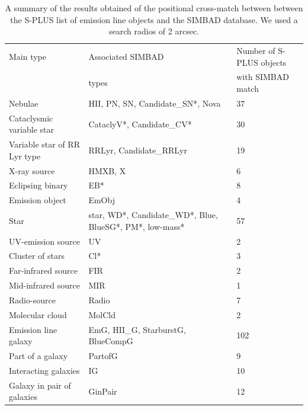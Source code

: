 \documentclass[fleqn,usenatbib]{mnras}
\begin{document}
\begin{table}
\centering
\caption{A summary of the results obtained of the positional cross-match between
        between the S-PLUS list of emission line objects and the SIMBAD database.
        We used a search radios of 2 arcsec.}
\label{tab:simbad-sources}
\begin{tabular}{lll} %
  \hline
Main type    & Associated SIMBAD           & Number of S-PLUS objects    \\
             & types                        &  with SIMBAD match         \\
\hline
Nebulae                & HII, PN, SN, Candidate\_SN*, Nova  & 37               \\
Cataclysmic variable star  & CataclyV*, Candidate\_CV* & 30              \\
Variable star of RR Lyr type & RRLyr, Candidate\_RRLyr & 19              \\
X-ray source                & HMXB, X                  & 6               \\
Eclipsing binary            & EB*                    & 8                 \\            
Emission object             & EmObj                  & 4                 \\
Star                        & star, WD*, Candidate\_WD*, Blue, BlueSG*, PM*, low-mass* & 57 \\
UV-emission source          & UV                     & 2                 \\
Cluster of stars            & Cl*                    & 3                 \\
Far-infrared source         & FIR                    & 2                 \\
Mid-infrared source         & MIR                    & 1                 \\
Radio-source                & Radio                  & 7                \\
Molecular cloud             & MolCld                 & 2                 \\
Emission line galaxy        & EmG, HII\_G, StarburstG, BlueCompG & 102   \\
Part of a galaxy            & PartofG                & 9                 \\
Interacting galaxies        & IG                     & 10                \\
Galaxy in pair of galaxies      & GinPair            & 12                \\

\end{tabular}
\end{table}
\end{document}
